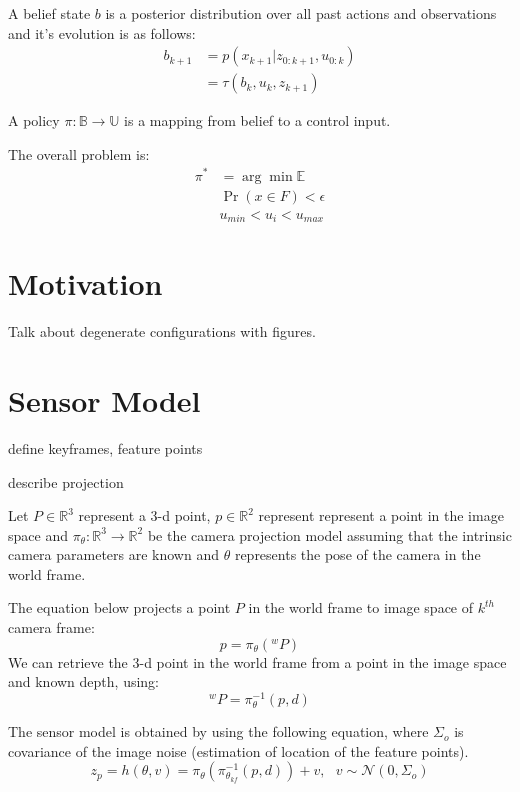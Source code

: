 \documentclass[conference]{IEEEtran}
\begin{document}
A belief state $b$ is a posterior distribution over all past actions and observations and it's evolution is as follows:
\begin{align}
    b_{k+1} &= p(x_{k+1}|z_{0:k+1}, u_{0:k}) \\
            &= \tau(b_k,u_k,z_{k+1})
\end{align} 

A policy $\pi : \mathbb{B} \to \mathbb{U}$ is a mapping from belief to a control input.

 The overall problem is:
\begin{align}
\pi^{*} &= \arg\min \mathbb{E}\\
\nonumber & \Pr(x\in F) < \epsilon \\
\nonumber & u_{min} < u_i < u_{max}
\end{align}

\section{Motivation}
Talk about degenerate configurations with figures.

\section{Sensor Model}

define keyframes, feature points

describe projection

Let $P \in \mathbb{R}^{3}$ represent a 3-d point, $p \in \mathbb{R}^2$ represent represent a point in the image space and $\pi_\theta:\mathbb{R}^3\to\mathbb{R}^2$ be the camera projection model assuming that the intrinsic camera parameters are known and $\theta$ represents the pose of the camera in the world frame.

The equation below projects a point $P$ in the world frame to image space of $k^{th}$ camera frame:
\begin{equation} p=\pi_\theta(^{w}P) \end{equation}
We can retrieve the 3-d point in the world frame from a point in the image space and known depth, using: 
\begin{equation} ^{w}P=\pi^{-1}_\theta(p,d) \end{equation}

The sensor model is obtained by using the following equation, where $\Sigma_o$ is covariance of the image noise (estimation of location of the feature points).
\begin{equation}
     z_p = h(\theta,v)=
     \pi_\theta(\pi^{-1}_{\theta_{kf}}(p,d)) + v,~~~ v\sim \mathcal{N}(0,\Sigma_{o})
     \label{eq:ObsModel}
\end{equation}
\end{document}
